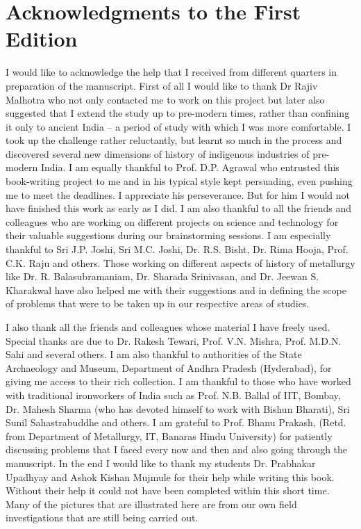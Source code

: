 \chapter*{Acknowledgments to the First Edition}\label{preface6}

\vspace{-.8cm}

I would like to acknowledge the help that I received from different quarters in preparation of the manuscript. First of all I would like to thank Dr Rajiv Malhotra who not only contacted me to work on this project but later also suggested that I extend the study up to pre-modern times, rather than confining it only to ancient India – a period of study with which I was more comfortable. I took up the challenge rather reluctantly, but learnt so much in the process and discovered several new dimensions of history of indigenous industries of pre-modern India. I am equally thankful to Prof. D.P. Agrawal who entrusted this book-writing project to me and in his typical style kept persuading, even pushing me to meet the deadlines. I appreciate his perseverance. But for him I would not have finished this work as early as I did.	I am also thankful to all the friends and colleagues who are working on different projects on science and technology for their valuable suggestions during our brainstorming sessions. I am especially thankful to Sri J.P. Joshi, Sri M.C. Joshi, Dr. R.S. Bisht, Dr. Rima Hooja, Prof. C.K. Raju and others. Those working on different aspects of history of metallurgy like Dr. R. Balasubramaniam, Dr. Sharada Srinivasan, and Dr. Jeewan S. Kharakwal have also helped me with their suggestions and in defining the scope of problems that were to be taken up in our respective areas of studies.

I also thank all the friends and colleagues whose material I have freely used. Special thanks are due to Dr. Rakesh Tewari, Prof. V.N. Mishra, Prof. M.D.N. Sahi and several others. I am also thankful to authorities of the State Archaeology and Museum, Department of Andhra Pradesh (Hyderabad), for giving me access to their rich collection. I am thankful to those who have worked with traditional ironworkers of India such as Prof. N.B. Ballal of IIT, Bombay, Dr. Mahesh Sharma (who has devoted himself to work with Bishun Bharati), Sri Sunil Sahastrabuddhe and others. I am grateful to Prof. Bhanu Prakash, (Retd. from Department of Metallurgy, IT, Banaras Hindu University) for patiently discussing problems that I faced every now and then and also going through the manuscript. In the end I would like to thank my students Dr. Prabhakar Upadhyay and Ashok Kishan Mujmule for their help while writing this book. Without their help it could not have been completed within this short time. Many of the pictures that are illustrated here are from our own field investigations that are still being carried out.

